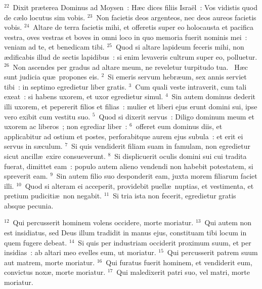 ${}^{22}$~Dixit pr\ae terea Dominus ad Moysen~: H\ae c dices filiis Isra\"el~: Vos vidistis quod de c\ae lo locutus sim vobis.
${}^{23}$~Non facietis deos argenteos, nec deos aureos facietis vobis.
${}^{24}$~Altare de terra facietis mihi, et offeretis super eo holocausta et pacifica vestra, oves vestras et boves in omni loco in quo memoria fuerit nominis mei~: veniam ad te, et benedicam tibi.
${}^{25}$~Quod si altare lapideum feceris mihi, non \ae dificabis illud de sectis lapidibus~: si enim levaveris cultrum super eo, polluetur.
${}^{26}$~Non ascendes per gradus ad altare meum, ne reveletur turpitudo tua.
~H\ae c sunt judicia qu\ae\ propones eis.
${}^{2}$~Si emeris servum hebr\ae um, sex annis serviet tibi~: in septimo egredietur liber gratis.
${}^{3}$~Cum quali veste intraverit, cum tali exeat~: si habens uxorem, et uxor egredietur simul.
${}^{4}$~Sin autem dominus dederit illi uxorem, et pepererit filios et filias~: mulier et liberi ejus erunt domini sui, ipse vero exibit cum vestitu suo.
${}^{5}$~Quod si dixerit servus~: Diligo dominum meum et uxorem ac liberos~; non egrediar liber~:
${}^{6}$~offeret eum dominus diis, et applicabitur ad ostium et postes, perforabitque aurem ejus subula~: et erit ei servus in s\ae culum.
${}^{7}$~Si quis vendiderit filiam suam in famulam, non egredietur sicut ancill\ae\ exire consueverunt.
${}^{8}$~Si displicuerit oculis domini sui cui tradita fuerat, dimittet eam~: populo autem alieno vendendi non habebit potestatem, si spreverit eam.
${}^{9}$~Sin autem filio suo desponderit eam, juxta morem filiarum faciet illi.
${}^{10}$~Quod si alteram ei acceperit, providebit puell\ae\ nuptias, et vestimenta, et pretium pudiciti\ae\ non negabit.
${}^{11}$~Si tria ista non fecerit, egredietur gratis absque pecunia.


${}^{12}$~Qui percusserit hominem volens occidere, morte moriatur.
${}^{13}$~Qui autem non est insidiatus, sed Deus illum tradidit in manus ejus, constituam tibi locum in quem fugere debeat.
${}^{14}$~Si quis per industriam occiderit proximum suum, et per insidias~: ab altari meo evelles eum, ut moriatur.
${}^{15}$~Qui percusserit patrem suum aut matrem, morte moriatur.
${}^{16}$~Qui furatus fuerit hominem, et vendiderit eum, convictus nox\ae , morte moriatur.
${}^{17}$~Qui maledixerit patri suo, vel matri, morte moriatur.


